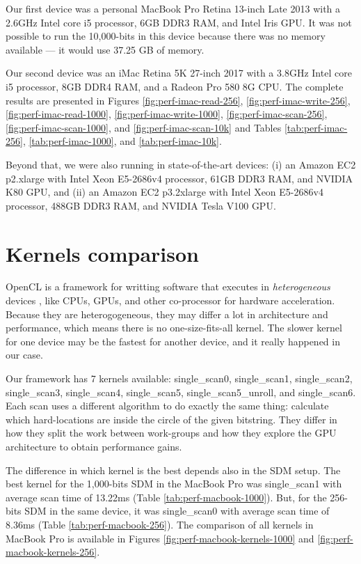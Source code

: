 Our first device was a personal MacBook Pro Retina 13-inch Late 2013 with a 2.6GHz Intel core i5 processor, 6GB DDR3 RAM, and Intel Iris GPU. It was not possible to run the 10,000-bits in this device because there was no memory available --- it would use 37.25 GB of memory.

Our second device was an iMac Retina 5K 27-inch 2017 with a 3.8GHz Intel core i5 processor, 8GB DDR4 RAM, and a Radeon Pro 580 8G CPU. The complete results are presented in Figures \ref{fig:perf-imac-read-256}, \ref{fig:perf-imac-write-256}, \ref{fig:perf-imac-read-1000}, \ref{fig:perf-imac-write-1000}, \ref{fig:perf-imac-scan-256}, \ref{fig:perf-imac-scan-1000}, and \ref{fig:perf-imac-scan-10k} and Tables \ref{tab:perf-imac-256}, \ref{tab:perf-imac-1000}, and \ref{tab:perf-imac-10k}.

Beyond that, we were also running in state-of-the-art devices: (i) an Amazon EC2 p2.xlarge with Intel Xeon E5-2686v4 processor, 61GB DDR3 RAM, and NVIDIA K80 GPU, and (ii) an Amazon EC2 p3.2xlarge with Intel Xeon E5-2686v4 processor, 488GB DDR3 RAM, and NVIDIA Tesla V100 GPU.


\section{Kernels comparison}

OpenCL is a framework for writting software that executes in \emph{heterogeneous} devices \citep{munshi2009opencl}, like CPUs, GPUs, and other co-processor for hardware acceleration. Because they are heterogogeneous, they may differ a lot in architecture and performance, which means there is no one-size-fits-all kernel. The slower kernel for one device may be the fastest for another device, and it really happened in our case.

Our framework has 7 kernels available: single\_scan0, single\_scan1, single\_scan2, single\_scan3, single\_scan4, single\_scan5, single\_scan5\_unroll, and single\_scan6. Each scan uses a different algorithm to do exactly the same thing: calculate which hard-locations are inside the circle of the given bitstring. They differ in how they split the work between work-groups and how they explore the GPU architecture to obtain performance gains.

The difference in which kernel is the best depends also in the SDM setup. The best kernel for the 1,000-bits SDM in the MacBook Pro was single\_scan1 with average scan time of 13.22ms (Table \ref{tab:perf-macbook-1000}). But, for the 256-bits SDM in the same device, it was single\_scan0 with average scan time of 8.36ms (Table \ref{tab:perf-macbook-256}). The comparison of all kernels in MacBook Pro is available in Figures \ref{fig:perf-macbook-kernels-1000} and \ref{fig:perf-macbook-kernels-256}.



